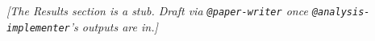 %

\textit{[The Results section is a stub. Draft via \texttt{@paper-writer} once \texttt{@analysis-implementer}'s outputs are in.]}
